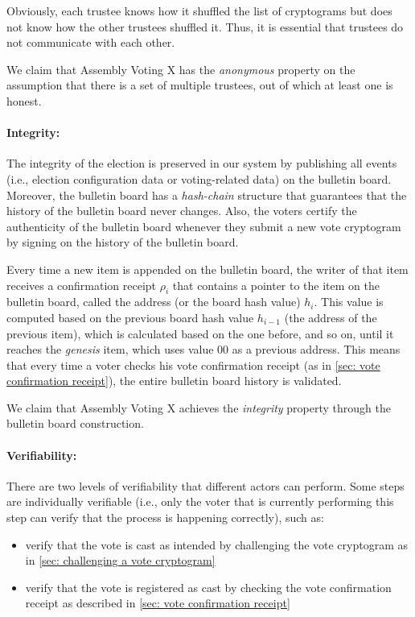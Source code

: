 Obviously, each trustee knows how it shuffled the list of cryptograms but does not know how the other trustees shuffled it. Thus, it is essential that trustees do not communicate with each other.

We claim that Assembly Voting X has the \textit{anonymous} property on the assumption that there is a set of multiple trustees, out of which at least one is honest.


\paragraph{Integrity:}
The integrity of the election is preserved in our system by publishing all events (i.e., election configuration data or voting-related data) on the bulletin board. Moreover, the bulletin board has a \textit{hash-chain} structure that guarantees that the history of the bulletin board never changes. Also, the voters certify the authenticity of the bulletin board whenever they submit a new vote cryptogram by signing on the history of the bulletin board.

Every time a new item is appended on the bulletin board, the writer of that item receives a confirmation receipt $\rho_i$ that contains a pointer to the item on the bulletin board, called the address (or the board hash value) $h_i$. This value is computed based on the previous board hash value $h_{i-1}$ (the address of the previous item), which is calculated based on the one before, and so on, until it reaches the \textit{genesis} item, which uses value 00 as a previous address. This means that every time a voter checks his vote confirmation receipt (as in \cref{sec: vote confirmation receipt}), the entire bulletin board history is validated.

We claim that Assembly Voting X achieves the \textit{integrity} property through the bulletin board construction.


\paragraph{Verifiability:}
There are two levels of verifiability that different actors can perform. Some steps are individually verifiable (i.e., only the voter that is currently performing this step can verify that the process is happening correctly), such as:
\begin{itemize}
    \item verify that the vote is cast as intended by challenging the vote cryptogram as in \cref{sec: challenging a vote cryptogram}
    \item verify that the vote is registered as cast by checking the vote confirmation receipt as described in  \cref{sec: vote confirmation receipt}
\end{itemize}

